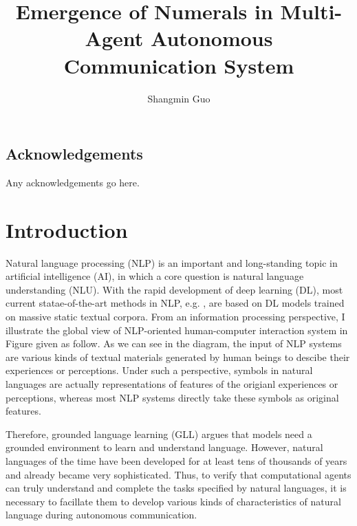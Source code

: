 \documentclass[msc,deptreport]{infthesis} %
\begin{document}
\begin{preliminary}

\title{Emergence of Numerals in Multi-Agent Autonomous Communication System}

\author{Shangmin Guo}


\maketitle

\section*{Acknowledgements}
Any acknowledgements go here. 

\tableofcontents
\end{preliminary}


\chapter{Introduction}
\label{ch1:intro}

Natural language processing (NLP) is an important and long-standing topic in artificial intelligence (AI), in which a core question is natural language understanding (NLU). With the rapid development of deep learning (DL), most current statae-of-the-art methods in NLP, e.g. \cite{socher2013recursive, word2vec2013, kim2014cnn}, are based on DL models trained on massive static textual corpora. From an information processing perspective, I illustrate the global view of NLP-oriented human-computer interaction system in Figure given as follow. As we can see in the diagram, the input of NLP systems are various kinds of textual materials generated by human beings to descibe their experiences or perceptions. Under such a perspective, symbols in natural languages are actually representations of features of the origianl experiences or perceptions, whereas most NLP systems directly take these symbols as original features.


Therefore, grounded language learning (GLL) argues that models need a grounded environment to learn and understand language\cite{matuszek2018grounded}. However, natural languages of the time have been developed for at least tens of thousands of years\cite{berwick2016only} and already became very sophisticated. Thus, to verify that computational agents can truly understand and complete the tasks specified by natural languages, it is necessary to facillate them to develop various kinds of characteristics of natural language during autonomous communication.
\end{document}
